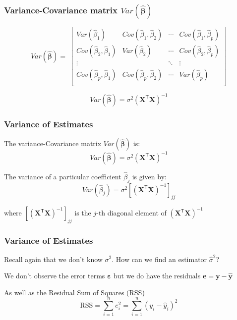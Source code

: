 \documentclass[12pt]{beamer}\usepackage[]{graphicx}\usepackage[]{color}
\begin{document}
\begin{frame}
\frametitle{Variance-Covariance matrix $Var(\mathbf{\boldsymbol{\hat{\beta}}})$}

$$
Var(\mathbf{\boldsymbol{\hat{\beta}}}) = 
\
\begin{bmatrix} 
Var(\hat{\beta}_1) & Cov(\hat{\beta}_1, \hat{\beta}_2) & \cdots & Cov(\hat{\beta}_1, \hat{\beta}_p) \\
Cov(\hat{\beta}_2, \hat{\beta}_1) & Var(\hat{\beta}_2) & \cdots & Cov(\hat{\beta}_2, \hat{\beta}_p) \\
\vdots &  & \ddots & \vdots \\
Cov(\hat{\beta}_p, \hat{\beta}_1) & Cov(\hat{\beta}_p, \hat{\beta}_2) & \cdots & Var(\hat{\beta}_p) \\
\end{bmatrix}
$$

$$
Var(\mathbf{\boldsymbol{\hat{\beta}}}) = \sigma^2 (\mathbf{X^\mathsf{T} X})^{-1}
$$

\end{frame}


\begin{frame}
\frametitle{Variance of Estimates}

The variance-Covariance matrix $Var(\mathbf{\boldsymbol{\hat{\beta}}})$ is:
$$
Var(\boldsymbol{\hat{\beta}}) = \sigma^2 (\mathbf{X^\mathsf{T} X})^{-1}
$$

\bigskip
The variance of a particular coefficient $\hat{\beta}_j$ is given by:
$$
Var(\hat{\beta}_j) = \sigma^2 \left [ (\mathbf{X^\mathsf{T} X})^{-1} \right ]_{jj} 
$$

where $\left [ (\mathbf{X^\mathsf{T} X})^{-1} \right ]_{jj}$ is the $j$-th diagonal element
of $(\mathbf{X^\mathsf{T} X})^{-1}$

\end{frame}


\begin{frame}
\frametitle{Variance of Estimates}

\bbi
  \item Recall again that we don't know $\sigma^2$. How can we find an estimator 
  $\hat{\sigma}^2$?
  \item We don't observe the error terms $\boldsymbol{\varepsilon}$ but we do have
  the residuals $\mathbf{e = y - \hat{y}}$
  \item As well as the Residual Sum of Squares (RSS)
  $$
  \text{RSS} = \sum_{i=1}^{n} e_{i}^{2} = \sum_{i=1}^{n} (y_i - \hat{y}_i)^2
  $$
\ei

\end{frame}
\end{document}
